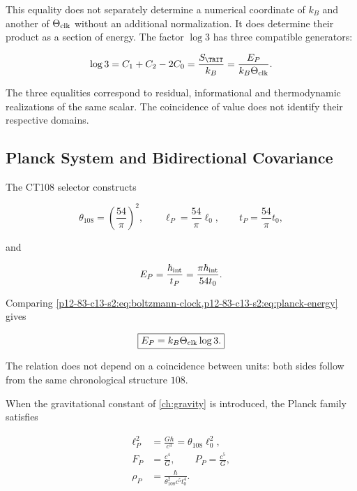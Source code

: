 This equality does not separately determine a numerical coordinate of \(k_B\) and another of \(\Theta_{\rm clk}\) without an additional normalization. It does determine their product as a section of energy. The factor \(\log3\) has three compatible generators:

\begin{equation}
\log3=C_1+C_2-2C_0
=\frac{S_{\TRIT}}{k_B}
=\frac{E_P}{k_B\Theta_{\rm clk}}.
\label{p12-83-c13-s2:eq:log3-triple}
\end{equation}

The three equalities correspond to residual, informational and
thermodynamic realizations of the same scalar. The coincidence of value does not identify
their respective domains.

\subsection{Planck System and Bidirectional Covariance}

The CT108 selector constructs

\begin{equation}
\theta_{108}=\left(\frac{54}{\pi}\right)^2,
\qquad
\ell_P=\frac{54}{\pi}\ell_0,
\qquad
t_P=\frac{54}{\pi}t_0,
\label{p12-83-c13-s2:eq:planck-length-time}
\end{equation}

and

\begin{equation}
E_P=\frac{\hbar_{\rm int}}{t_P}
=\frac{\pi\hbar_{\rm int}}{54t_0}.
\label{p12-83-c13-s2:eq:planck-energy}
\end{equation}

Comparing \cref{p12-83-c13-s2:eq:boltzmann-clock,p12-83-c13-s2:eq:planck-energy} gives

\begin{equation}
\boxed{E_P=k_B\Theta_{\rm clk}\log3.}
\label{p12-83-c13-s2:eq:planck-trit}
\end{equation}

The relation does not depend on a coincidence between units: both sides
follow from the same chronological structure \(108\).

When the gravitational constant of \cref{ch:gravity} is introduced, the Planck family satisfies

\begin{align}
\ell_P^2&=\frac{G\hbar}{c^3}=\theta_{108}\ell_0^2,
\label{p12-83-c13-s2:eq:planck-area}\\
F_P&=\frac{c^4}{G},
\qquad
P_P=\frac{c^5}{G},
\label{p12-83-c13-s2:eq:planck-force-power}\\
\rho_P&=\frac{\hbar}{\theta_{108}^2c^5t_0^4}.
\label{p12-83-c13-s2:eq:planck-density}
\end{align}

